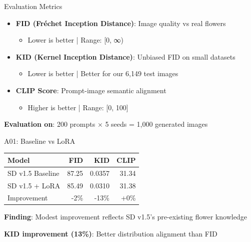 \documentclass{beamer}
\begin{document}
\begin{frame}{Evaluation Metrics}
\begin{itemize}
    \item \textbf{FID (Fréchet Inception Distance)}: Image quality vs real flowers
    \begin{itemize}
        \item Lower is better | Range: [0, ∞)
    \end{itemize}

    \item \textbf{KID (Kernel Inception Distance)}: Unbiased FID on small datasets
    \begin{itemize}
        \item Lower is better | Better for our 6,149 test images
    \end{itemize}

    \item \textbf{CLIP Score}: Prompt-image semantic alignment
    \begin{itemize}
        \item Higher is better | Range: [0, 100]
    \end{itemize}
\end{itemize}

\vspace{0.3cm}
\textbf{Evaluation on}: 200 prompts × 5 seeds = 1,000 generated images
\end{frame}

\begin{frame}{A01: Baseline vs LoRA}
\begin{table}
\centering
\begin{tabular}{lrrr}
\toprule
Model & FID & KID & CLIP \\
\midrule
SD v1.5 Baseline & 87.25 & 0.0357 & 31.34 \\
SD v1.5 + LoRA & 85.49 & 0.0310 & 31.38 \\
Improvement & -2\% & -13\% & +0\% \\
\bottomrule
\end{tabular}
\end{table}

\textbf{Finding}: Modest improvement reflects SD v1.5's pre-existing flower knowledge

\textbf{KID improvement (13\%)}: Better distribution alignment than FID
\end{frame}
\end{document}
